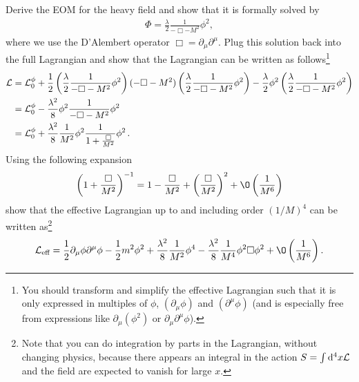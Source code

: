 \documentclass[11pt]{latex/exercise}
\begin{document}
\begin{itemize}
          Derive the EOM for the heavy field and show that it is formally solved by
          \begin{gather}
              \Phi=\frac{\lambda}{2}\frac{1}{-\Box -M^2}\phi^2,
              \label{eq:formal_sol}
          \end{gather}
          where we use the D'Alembert operator $\Box=\partial_{\mu}\partial^{\mu}$.
          Plug this solution back into the full Lagrangian and show that the Lagrangian can be written as follows\footnote{You should transform and simplify the effective Lagrangian such that it is only expressed in multiples of $\phi$, $(\partial_{\mu}\phi)$ and $(\partial^{\mu}\phi)$
              (and is especially free from expressions like $\partial_{\mu}(\phi^2)$ or $\partial_{\mu}\partial^{\mu}\phi$).}
          \begin{align}
              \mathcal{L} & =\mathcal{L}_0^{\phi}
              +\frac{1}{2}\left(\frac{\lambda}{2}\frac{1}{-\Box -M^2}\phi^2\right)
              (-\Box-M^2)
              \left(\frac{\lambda}{2}\frac{1}{-\Box -M^2}\phi^2\right)
              -\frac{\lambda}{2}\phi^2 \left(\frac{\lambda}{2}\frac{1}{-\Box -M^2}\phi^2\right)
              \\
                 & =\mathcal{L}_0^{\phi}-\frac{\lambda^2}{8}\phi^2 \frac{1}{-\Box -M^2}\phi^2
              \\
                 & =\mathcal{L}_0^{\phi}+\frac{\lambda^2}{8}\frac{1}{M^2}\phi^2 \frac{1}{1+\frac{\Box}{M^2}}\phi^2
              \,.
          \end{align}
          Using the following expansion
          \begin{gather}
              \left(1+\frac{\Box}{M^2}\right)^{-1}
              =1-\frac{\Box}{M^2}+\left(\frac{\Box}{M^2}\right)^2
              +\O\left(\frac{1}{M^6}\right)
          \end{gather}
          show that the effective Lagrangian up to and including order $(1/M)^4$ can be written as\footnote{Note that you can do integration by parts in the Lagrangian, without changing physics, because there appears an integral in the action $S=\int\mathrm{d}^ 4 x \mathcal{L}$ and the field are expected to vanish for large $x$.}
          \begin{gather}
              \L_{\text{eff}}=
              \frac{1}{2}\partial_{\mu}\phi\partial^{\mu}\phi
              -\frac{1}{2}m^2\phi^2
              +\frac{\lambda^2}{8}\frac{1}{M^2}\phi^4
              -\frac{\lambda^2}{8}\frac{1}{M^4}\phi^2 \Box \phi^2
              +\O\left(\frac{1}{M^6}\right).
          \end{gather}


\end{itemize}
\end{document}
